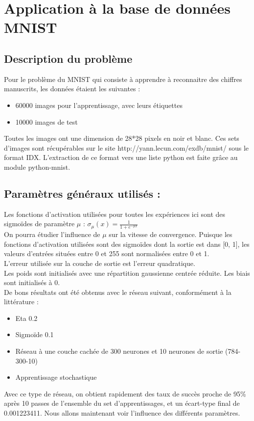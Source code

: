 \section{Application à la base de données MNIST}

\subsection*{Description du problème} %

Pour le problème du MNIST qui consiste à apprendre à reconnaitre des chiffres manuscrits, les données étaient les suivantes : 
\begin{itemize}
	\item 60000 images pour l’apprentissage, avec leurs étiquettes
	\item 10000 images de test
\end{itemize}

Toutes les images ont une dimension de 28*28 pixels en noir et blanc. Ces sets d’images sont récupérables sur le site http://yann.lecun.com/exdb/mnist/ sous le format IDX. L’extraction de ce format vers une liste python est faite grâce au module python-mnist.

\subsection*{Paramètres généraux utilisés :} %
Les fonctions d’activation utilisées pour toutes les expériences ici sont des sigmoïdes de paramètre $\mu$ : 
$\sigma_\mu(x) = \frac{1}{1+e^{-\mu x}}$\\
On pourra étudier l’influence de $\mu$ sur la vitesse de convergence.
Puisque les fonctions d’activation utilisées sont des sigmoïdes dont la sortie est dans [0, 1], les valeurs d’entrées situées entre 0 et 255 sont normalisées entre 0 et 1.\\
L’erreur utilisée sur la couche de sortie est l’erreur quadratique.\\
Les poids sont initialisés avec une répartition gaussienne centrée réduite. Les biais sont initialisés à 0.\\
De bons résultats ont été obtenus avec le réseau suivant, conformément à la littérature :
\begin{itemize}
	\item Eta 0.2
	\item Sigmoïde 0.1
	\item Réseau à une couche cachée de 300 neurones et 10 neurones de sortie (784-300-10)
	\item Apprentissage stochastique
\end{itemize}
Avec ce type de réseau, on obtient rapidement des taux de succès proche de 95\% après 10 passes de l’ensemble du set d’apprentissages, et un écart-type final de 0.001223411. Nous allons maintenant voir l’influence des différents paramètres.

